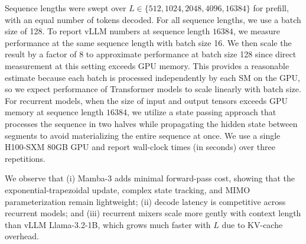 Sequence lengths were swept over $L \in \{512, 1024, 2048, 4096, 16384\}$ for prefill, with an equal number of tokens decoded.
For all sequence lengths, we use a batch size of 128. To report vLLM numbers at sequence length $16384$, we measure performance at the same sequence length with batch size 16.
We then scale the result by a factor of 8 to approximate performance at batch size 128 since direct measurement at this setting exceeds GPU memory.
This provides a reasonable estimate because each batch is processed independently by each SM on the GPU, so we expect performance of Transformer models to scale linearly with batch size.
For recurrent models, when the size of input and output tensors exceeds GPU memory at sequence length $16384$, we utilize a state passing approach that processes the sequence in two halves while propagating the hidden state between segments to avoid materializing the entire sequence at once.
We use a single H100-SXM 80GB GPU and report wall-clock times (in seconds) over three repetitions.

We observe that (i) Mamba-3 adds minimal forward-pass cost, showing that the exponential-trapezoidal update, complex state tracking, and MIMO parameterization remain lightweight; (ii) decode latency is competitive across recurrent models; and (iii) recurrent mixers scale more gently with context length than vLLM Llama-3.2-1B, which grows much faster with $L$ due to KV-cache overhead.
